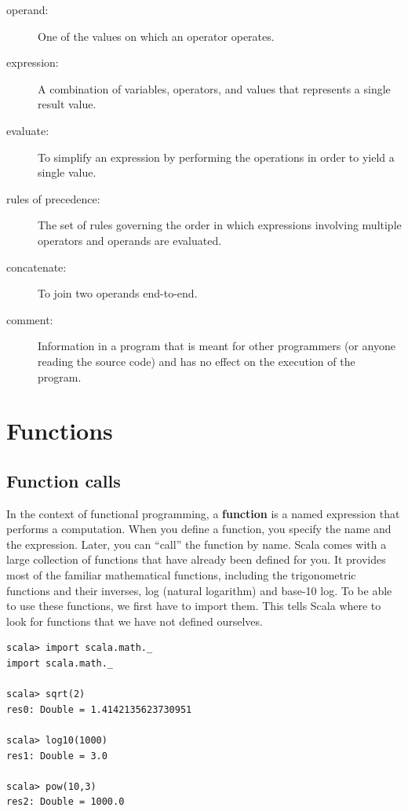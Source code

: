 \documentclass[10pt]{book}
\begin{document}
\begin{description}
\item[operand:] One of the values on which an operator operates.

\item[expression:] A combination of variables, operators, and values that
represents a single result value.

\item[evaluate:] To simplify an expression by performing the operations
in order to yield a single value.

\item[rules of precedence:] The set of rules governing the order in which
expressions involving multiple operators and operands are evaluated.

\item[concatenate:] To join two operands end-to-end.

\item[comment:] Information in a program that is meant for other
programmers (or anyone reading the source code) and has no effect on the
execution of the program.

\end{description}


\chapter{Functions}
\label{funcchap}

\section{Function calls}
\label{functionchap}

In the context of functional programming, a {\bf function} is a named 
expression that performs a computation.  When you define a function,
you specify the name and the expression.  Later, you can ``call'' the 
function by name. Scala comes with a large collection of functions that have already been defined
for you. It provides most of the familiar mathematical functions, including
the trigonometric functions and their inverses, log (natural logarithm) and base-10 log. To be able
to use these functions, we first have to import them. This tells Scala where to look
for functions that we have not defined ourselves.

\beforeverb
\begin{verbatim}
scala> import scala.math._
import scala.math._

scala> sqrt(2)
res0: Double = 1.4142135623730951

scala> log10(1000)
res1: Double = 3.0

scala> pow(10,3)
res2: Double = 1000.0
\end{verbatim}
\afterverb
\end{document}
